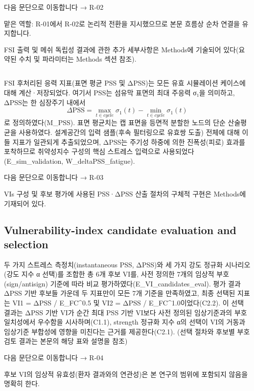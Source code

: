 \documentclass[preprint,12pt]{elsarticle}
\begin{document}
다음 문단으로 이동합니다 → R-02

맡은 역할: R-01에서 R-02로 논리적 전환을 지시했으므로 본문 흐름상 순차 연결을 유지합니다.

FSI 출력 및 메쉬 독립성 결과에 관한 추가 세부사항은 Methods에 기술되어 있다(요약된 수치 및 파라미터는 Methods 섹션 참조).

\subsection{}
FSI 후처리된 응력 지표(표면 평균 PSS 및 ΔPSS)는 모든 유효 시뮬레이션 케이스에 대해 계산·저장되었다. 여기서 PSS는 섬유막 표면의 최대 주응력 σ₁을 의미하고, ΔPSS는 한 심장주기 내에서 $$\Delta\mathrm{PSS}=\max_{t\in cycle}\sigma_1(t)-\min_{t\in cycle}\sigma_1(t)$$ 로 정의하였다(M\_PSS). 표면 평균치는 캡 표면을 등면적 분할한 노드의 단순 산술평균을 사용하였다. 설계공간의 입력 샘플(후속 필터링으로 유효쌍 도출) 전체에 대해 이들 지표가 일관되게 추출되었으며, ΔPSS는 주기성 하중에 의한 진폭성(피로) 효과를 포착하므로 취약성지수 구성의 핵심 스트레스 입력으로 사용되었다(E\_sim\_validation, W\_deltaPSS\_fatigue).

다음 문단으로 이동합니다 → R-03

VIs 구성 및 후보 평가에 사용된 PSS·ΔPSS 산출 절차의 구체적 구현은 Methods에 기재되어 있다.

\subsection{Vulnerability-index candidate evaluation and selection}
두 가지 스트레스 측정치(instantaneous PSS, ΔPSS)와 세 가지 강도 정규화 시나리오(강도 지수 α 선택)를 조합한 총 6개 후보 VI를, 사전 정의한 7개의 임상적 부호(sign/antisign) 기준에 따라 비교 평가하였다(E\_VI\_candidates\_eval). 평가 결과 ΔPSS 기반 후보들 가운데 두 지표만이 모든 7개 기준을 만족하였고, 최종 선택된 지표는 VI1 = ΔPSS / E\_{FC}\textasciicircum {0.5} 및 VI2 = ΔPSS / E\_{FC}\textasciicircum {1.0}이었다(C2.2). 이 선택 결과는 ΔPSS 기반 VI가 순간 최대 PSS 기반 VI보다 사전 정의된 임상기준과의 부호 일치성에서 우수함을 시사하며(C1.1), strength 정규화 지수 α의 선택이 VI의 거동과 임상기준 부합성에 영향을 미친다는 근거를 제공한다(C2.1). (선택 절차와 후보별 부호 검토 결과는 본문의 해당 표와 설명을 참조)

다음 문단으로 이동합니다 → R-04

후보 VI의 임상적 유효성(환자 결과와의 연관성)은 본 연구의 범위에 포함되지 않음을 명확히 한다.
\end{document}
